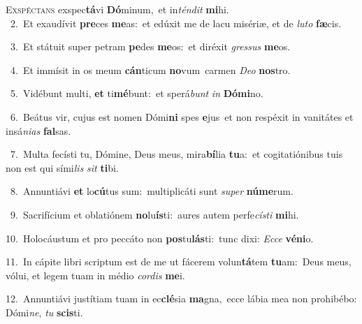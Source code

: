 \lettrine{\initial\textcolor{\initialcolor}{E}}{xspéctans} exspec\-\textbf{tá}\-vi \textbf{Dó}\-minum,~\star et in\-\textit{tén}\-\textit{dit} \textbf{mi}\-hi.\\
{\numbfont\textcolor{\numbcolor}{~2.}}~Et exaudívit \textbf{pre}\-ces \textbf{me}\-as:~\star et edúxit me de lacu misériæ, et de \textit{lu}\-\textit{to} \textbf{fæ}\-cis.\par
{\numbfont\textcolor{\numbcolor}{~3.}}~Et státuit super petram \textbf{pe}\-des \textbf{me}\-os:~\star et diréxit \textit{gres}\-\textit{sus} \textbf{me}\-os.\par
{\numbfont\textcolor{\numbcolor}{~4.}}~Et immísit in os meum \textbf{cán}\-ticum \textbf{no}\-vum~\star carmen \textit{De}\-\textit{o} \textbf{nos}\-tro.\par
{\numbfont\textcolor{\numbcolor}{~5.}}~Vidébunt multi, \textbf{et} ti\-\textbf{mé}\-bunt:~\star et sperá\textit{bunt} \textit{in} \textbf{Dó}\-\textbf{mi}no.\par
{\numbfont\textcolor{\numbcolor}{~6.}}~Beátus vir, cujus est nomen Dómi\textbf{ni} spes \textbf{e}\-jus~\star et non respéxit in vanitátes et insá\-\textit{ni}\-\textit{as} \textbf{fal}\-sas.\par
{\numbfont\textcolor{\numbcolor}{~7.}}~Multa fecísti tu, Dómine, Deus meus, mira\-\textbf{bí}\-lia \textbf{tu}\-a:~\star et cogitatiónibus tuis non est qui sími\textit{lis} \textit{sit} \textbf{ti}\-bi.\par
{\numbfont\textcolor{\numbcolor}{~8.}}~Annuntiávi \textbf{et} lo\-\textbf{cú}\-tus sum:~\star multiplicáti sunt \textit{su}\-\textit{per} \textbf{nú}\-\textbf{me}rum.\par
{\numbfont\textcolor{\numbcolor}{~9.}}~Sacrifícium et oblatiónem \textbf{no}\-lu\-\textbf{ís}\-ti:~\star aures autem perfe\-\textit{cís}\-\textit{ti} \textbf{mi}\-hi.\par
{\numbfont\textcolor{\numbcolor}{10.}}~Holocáustum et pro peccáto non \textbf{pos}\-tu\-\textbf{lás}\-ti:~\star tunc dixi: \textit{Ec}\-\textit{ce} \textbf{vé}\-\textbf{ni}o.\par
{\numbfont\textcolor{\numbcolor}{11.}}~In cápite libri scriptum est de me ut fácerem volun\-\textbf{tá}\-tem \textbf{tu}\-am:~\star Deus meus, vólui, et legem tuam in médio \textit{cor}\-\textit{dis} \textbf{me}\-i.\par
{\numbfont\textcolor{\numbcolor}{12.}}~Annuntiávi justítiam tuam in ec\-\textbf{clé}\-sia \textbf{ma}\-gna,~\star ecce lábia mea non prohibébo: Dómi\-\textit{ne}\-, \textit{tu} \textbf{scis}\-ti.\par
